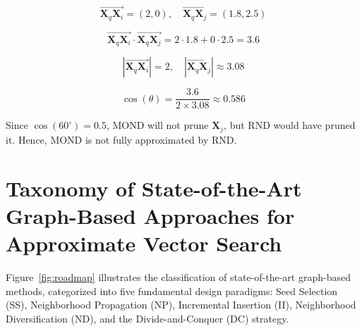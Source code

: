 \[
\overrightarrow{\mathbf{X}_q \mathbf{X}_i} = (2, 0), \quad \overrightarrow{\mathbf{X}_q \mathbf{X}_j} = (1.8, 2.5)
\]

\[
\overrightarrow{\mathbf{X}_q \mathbf{X}_i} \cdot \overrightarrow{\mathbf{X}_q \mathbf{X}_j} = 2 \cdot 1.8 + 0 \cdot 2.5 = 3.6
\]

\[
|\overrightarrow{\mathbf{X}_q \mathbf{X}_i}| = 2, \quad |\overrightarrow{\mathbf{X}_q \mathbf{X}_j}| \approx 3.08
\]

\[
\cos(\theta) = \frac{3.6}{2 \times 3.08} \approx 0.586
\]

Since \( \cos(60^\circ) = 0.5 \), MOND will not prune \(\mathbf{X}_j\), but RND would have pruned it. Hence, MOND is not fully approximated by RND.




 




\section{Taxonomy of State-of-the-Art Graph-Based Approaches for Approximate Vector Search}

Figure~\ref{fig:roadmap} illustrates the classification of state-of-the-art graph-based methods, categorized into five fundamental design paradigms: Seed Selection (SS), Neighborhood Propagation (NP), Incremental Insertion (II), Neighborhood Diversification (ND), and the Divide-and-Conquer (DC) strategy.


